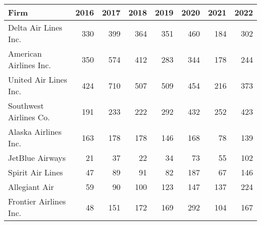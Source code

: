 
\begin{tabular}{lrrrrrrr}
\toprule
Firm & 2016 & 2017 & 2018 & 2019 & 2020 & 2021 & 2022\\
\midrule
Delta Air Lines Inc. & 330 & 399 & 364 & 351 & 460 & 184 & 302\\
American Airlines Inc. & 350 & 574 & 412 & 283 & 344 & 178 & 244\\
United Air Lines Inc. & 424 & 710 & 507 & 509 & 454 & 216 & 373\\
Southwest Airlines Co. & 191 & 233 & 222 & 292 & 432 & 252 & 423\\
Alaska Airlines Inc. & 163 & 178 & 178 & 146 & 168 & 78 & 139\\
\addlinespace
JetBlue Airways & 21 & 37 & 22 & 34 & 73 & 55 & 102\\
Spirit Air Lines & 47 & 89 & 91 & 82 & 187 & 67 & 146\\
Allegiant Air & 59 & 90 & 100 & 123 & 147 & 137 & 224\\
Frontier Airlines Inc. & 48 & 151 & 172 & 169 & 292 & 104 & 167\\
\bottomrule
\end{tabular}
